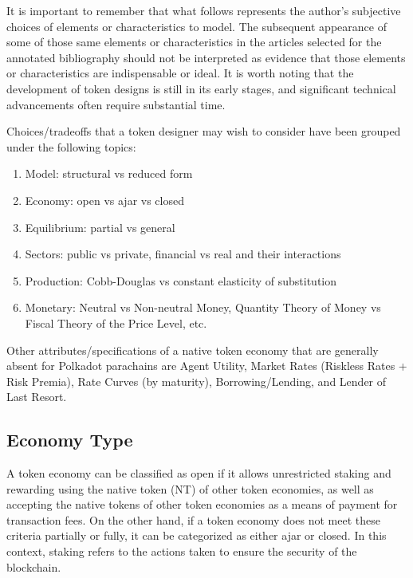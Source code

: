 \documentclass[11pt]{article}
\begin{document}
It is important to remember that what follows represents the author's subjective choices of elements or characteristics to model. The subsequent appearance of some of those same elements or characteristics in the articles selected for the annotated bibliography should not be interpreted as evidence that those elements or characteristics are indispensable or ideal. It is worth noting that the development of token designs is still in its early stages, and significant technical advancements often require substantial time.

Choices/tradeoffs that a token designer may wish to consider have been grouped under the following topics:

\begin{enumerate}
    \item[] Model: structural vs reduced form
    \item[] Economy: open vs ajar vs closed
    \item[] Equilibrium: partial vs general
    \item[] Sectors: public vs private, financial vs real and their interactions
    \item[] Production: Cobb-Douglas vs constant elasticity of substitution
    \item[] Monetary: Neutral vs Non-neutral Money, Quantity Theory of Money vs Fiscal Theory of the Price Level, etc.
\end{enumerate}

Other attributes/specifications of a native token economy that are generally absent for Polkadot parachains are Agent Utility, Market Rates (Riskless Rates + Risk Premia), Rate Curves (by maturity), Borrowing/Lending, and Lender of Last Resort.

\subsection{Economy Type}
A token economy can be classified as open if it allows unrestricted staking and rewarding using the native token (NT) of other token economies, as well as accepting the native tokens of other token economies as a means of payment for transaction fees. On the other hand, if a token economy does not meet these criteria partially or fully, it can be categorized as either ajar or closed. In this context, staking refers to the actions taken to ensure the security of the blockchain. 
\end{document}
